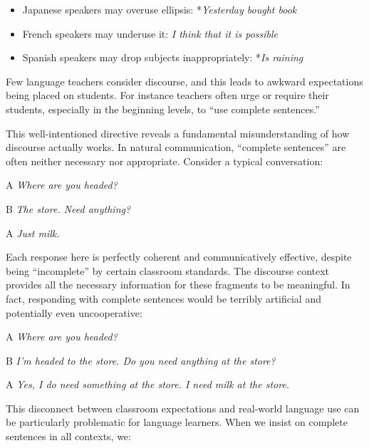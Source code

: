 \begin{itemize}[noitemsep]
\item Japanese speakers may overuse ellipsis: *\textit{Yesterday bought book}
\item French speakers may underuse it: \textit{I think that it is possible}
\item Spanish speakers may drop subjects inappropriately: *\textit{Is raining}
\end{itemize}

\begin{tcolorbox}[title=``Use complete sentences'', colback=white, colframe=blue!75!black, fonttitle=\bfseries]\label{sec:complete-sentences}
Few language teachers consider discourse, and this leads to awkward expectations being placed on students. For instance teachers often urge or require their students, especially in the beginning levels, to ``use complete sentences.''

\phantom{~~~~}This well-intentioned directive reveals a fundamental misunderstanding of how discourse actually works. In natural communication, ``complete sentences'' are often neither necessary nor appropriate. Consider a typical conversation:

\begin{dialogue}
   \item[A] \textit{Where are you headed?}
   \item[B] \textit{The store. Need anything?}
   \item[A] \textit{Just milk.}
\end{dialogue}

Each response here is perfectly coherent and communicatively effective, despite being ``incomplete'' by certain classroom standards. The discourse context provides all the necessary information for these fragments to be meaningful. In fact, responding with complete sentences would be terribly artificial and potentially even uncooperative:

\begin{dialogue}
   \item[A] \textit{Where are you headed?}
   \item[B] \textit{I'm headed to the store. Do you need anything at the store?}
   \item[A] \textit{Yes, I do need something at the store. I need milk at the store.}
\end{dialogue}

This disconnect between classroom expectations and real-world language use can be particularly problematic for language learners. When we insist on complete sentences in all contexts, we:


\end{tcolorbox}
